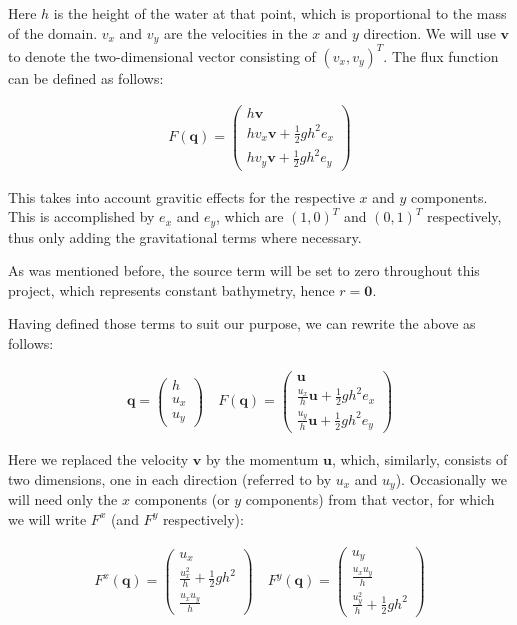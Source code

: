 \documentclass{article}
\begin{document}
Here $h$ is the height of the water at that point, which is proportional to the mass of the domain. $v_x$ and $v_y$ are the velocities in the $x$ and $y$ direction. We will use $\mathbf{v}$ to denote the two-dimensional vector consisting of $\left( v_x, v_y \right)^T$. The flux function can be defined as follows:

\begin{eqnarray*}
  F(\mathbf{q}) =
  \begin{pmatrix}
    h \mathbf{v} \\ h v_x \mathbf{v} + \frac{1}{2} g h^2 e_x \\ h v_y \mathbf{v} + \frac{1}{2} g h^2 e_y
  \end{pmatrix}
\end{eqnarray*}

This takes into account gravitic effects for the respective $x$ and $y$ components. This is accomplished by $e_x$ and $e_y$, which are $\left(1, 0\right)^T$ and $\left(0, 1\right)^T$ respectively, thus only adding the gravitational terms where necessary.

As was mentioned before, the source term will be set to zero throughout this project, which represents constant bathymetry, hence $r=\mathbf{0}$.

Having defined those terms to suit our purpose, we can rewrite the above as follows:

\begin{eqnarray}
  \label{eqn:shallow-water-flux}
  \mathbf{q} =
  \begin{pmatrix}
    h \\ u_x \\ u_y
  \end{pmatrix} \quad
  F(\mathbf{q}) =
  \begin{pmatrix}
    \mathbf{u} \\ \frac{u_x}{h}\mathbf{u} + \frac{1}{2} g h^2 e_x \\ \frac{u_y}{h}\mathbf{u} + \frac{1}{2} g h^2 e_y
  \end{pmatrix}
\end{eqnarray}

Here we replaced the velocity $\mathbf{v}$ by the momentum $\mathbf{u}$, which, similarly, consists of two dimensions, one in each direction (referred to by $u_x$ and $u_y$). Occasionally we will need only the $x$ components (or $y$ components) from that vector, for which we will write $F^x$ (and $F^y$ respectively):

\begin{eqnarray*}
  F^x(\mathbf{q}) =
  \begin{pmatrix}
    u_x \\ \frac{u_x^2}{h} + \frac{1}{2} g h^2 \\ \frac{u_x u_y}{h}
  \end{pmatrix}
  \quad
  F^y(\mathbf{q}) =
  \begin{pmatrix}
    u_y \\ \frac{u_x u_y}{h} \\ \frac{u_y^2}{h} + \frac{1}{2} g h^2
  \end{pmatrix}
\end{eqnarray*}
\end{document}
